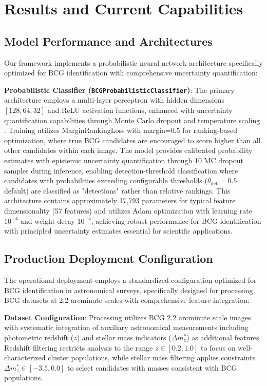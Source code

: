 \documentclass[twocolumn,10pt]{aastex631}
\begin{document}
\section{Results and Current Capabilities}

\subsection{Model Performance and Architectures}

Our framework implements a probabilistic neural network architecture specifically optimized for BCG identification with comprehensive uncertainty quantification:

\textbf{Probabilistic Classifier (\texttt{BCGProbabilisticClassifier})}: The primary architecture employs a multi-layer perceptron with hidden dimensions $[128, 64, 32]$ and ReLU activation functions, enhanced with uncertainty quantification capabilities through Monte Carlo dropout \citep{Gal2016MCDropout} and temperature scaling \citep{Laves2019WellCalibratedMU}. Training utilizes MarginRankingLoss with margin=0.5 for ranking-based optimization, where true BCG candidates are encouraged to score higher than all other candidates within each image. The model provides calibrated probability estimates with epistemic uncertainty quantification through 10 MC dropout samples during inference, enabling detection-threshold classification where candidates with probabilities exceeding configurable thresholds ($\theta_{\text{det}} = 0.5$ default) are classified as "detections" rather than relative rankings. This architecture contains approximately 17,793 parameters for typical feature dimensionality (57 features) and utilizes Adam optimization with learning rate $10^{-4}$ and weight decay $10^{-4}$, achieving robust performance for BCG identification with principled uncertainty estimates essential for scientific applications.

\subsection{Production Deployment Configuration}

The operational deployment employs a standardized configuration optimized for BCG identification in astronomical surveys, specifically designed for processing BCG datasets at 2.2 arcminute scales with comprehensive feature integration:

\textbf{Dataset Configuration}: Processing utilizes BCG 2.2 arcminute scale images with systematic integration of auxiliary astronomical measurements including photometric redshift ($z$) and stellar mass indicators ($\Delta m^*_z$) as additional features. Redshift filtering restricts analysis to the range $z \in [0.2, 1.0]$ to focus on well-characterized cluster populations, while stellar mass filtering applies constraints $\Delta m^*_z \in [-3.5, 0.0]$ to select candidates with masses consistent with BCG populations.
\end{document}
